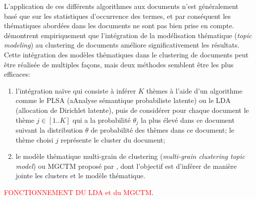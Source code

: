 L'application de ces différents algorithmes aux documents n'est généralement basé que sur les statistiques d'occurrence des termes, et par conséquent les thématiques abordées dans les documents ne sont pas bien prise en compte. \citet{xie2013MGCTM} démontrent empiriquement que l'intégration de la  modélisation thématique (\textit{topic modeling}) au clustering de documents améliore significativement les résultats. Cette intégration des modèles thématiques dans le clustering de documents peut être réalisée de multiples façons, mais deux méthodes semblent être les plus efficaces:
\begin{enumerate}
	\item l'intégration naïve \citep{lu2011kmeansLDApLSA} qui consiste à inférer $K$ thèmes à l'aide d'un algorithme comme le PLSA (aAnalyse sémantique probabiliste latente) \citep{hofmann1999PLSA} ou le LDA (allocation de Dirichlet latente)\citep{blei2003lda}, puis de considérer pour chaque document le thème $j \in [1..K]$ qui a la probabilité $\theta_j$ la plus élevé dans ce document suivant la distribution $\theta$ de probabilité des thèmes dans ce document; le thème choisi $j$ représente le cluster du document;
	\item le modèle thématique multi-grain de clustering (\textit{multi-grain clustering topic model}) ou MGCTM proposé par \citet{xie2013MGCTM}, dont l'objectif est d'inférer de manière jointe les clusters et le modèle thématique.
\end{enumerate}

\textcolor{red}{FONCTIONNEMENT DU LDA et du MGCTM}.

